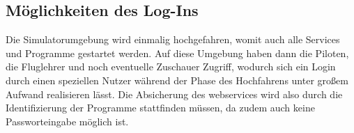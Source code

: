 \subsection{Möglichkeiten des Log-Ins}\label{subsec:möglichkeiten-des-log-ins}
	Die Simulatorumgebung wird einmalig hochgefahren,
	womit auch alle Services und Programme gestartet werden.
	Auf diese Umgebung haben dann die Piloten,
	die Fluglehrer
	und noch eventuelle Zuschauer Zugriff,
	wodurch sich ein Login durch einen speziellen Nutzer
	während der Phase des Hochfahrens unter großem Aufwand realisieren lässt.
	Die Absicherung des \glspl{webservice} wird also durch die Identifizierung der Programme stattfinden müssen,
	da zudem auch keine Passworteingabe möglich ist.